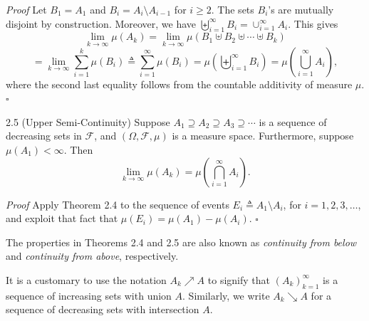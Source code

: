 \textit{Proof} Let $B_1=A_1$ and $B_i=A_i\setminus A_{i-1}$ for $i\ge 2$. The sets $B_i$'s are mutually disjoint by construction. Moreover, we have $\biguplus_{i=1}^{\infty} B_i=\cup_{i=1}^{\infty} A_i$. This gives
\[
\lim_{k\to\infty} \mu(A_k)
=
\lim_{k\to\infty} \mu(B_1 \uplus B_2 \uplus \cdots \uplus B_k)
\]
\[
=
\lim_{k\to\infty} \sum_{i=1}^{k} \mu(B_i)
\triangleq
\sum_{i=1}^{\infty} \mu(B_i)
=
\mu\left(\biguplus_{i=1}^{\infty} B_i\right)
=
\mu\left(\bigcup_{i=1}^{\infty} A_i\right),
\]
where the second last equality follows from the countable additivity of measure $\mu$. \hfill $\square$

\begin{thmbox}{2.5 (Upper Semi-Continuity)}
Suppose $A_1\supseteq A_2\supseteq A_3\supseteq \cdots$ is a sequence of decreasing sets in $\mathcal{F}$, and $(\Omega,\mathcal{F},\mu)$ is a measure space. Furthermore, suppose $\mu(A_1)<\infty$. Then
\[
\lim_{k\to\infty} \mu(A_k)=\mu\left(\bigcap_{i=1}^{\infty} A_i\right).
\]
\end{thmbox}

\textit{Proof} Apply Theorem 2.4 to the sequence of events $E_i\triangleq A_1\setminus A_i$, for $i=1,2,3,\dots$, and exploit that fact that $\mu(E_i)=\mu(A_1)-\mu(A_i)$. \hfill $\square$

The properties in Theorems 2.4 and 2.5 are also known as \textit{continuity from below} and \textit{continuity from above}, respectively.

It is a customary to use the notation $A_k \nearrow A$ to signify that $(A_k)_{k=1}^{\infty}$ is a sequence of increasing sets with union $A$. Similarly, we write $A_k \searrow A$ for a sequence of decreasing sets with intersection $A$.
